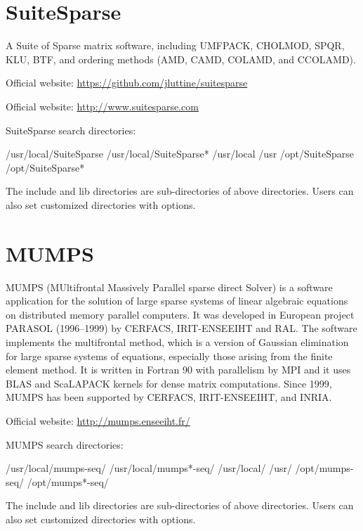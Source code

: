 \documentclass[12pt]{book}
\begin{document}
\section{SuiteSparse}
A Suite of Sparse matrix software, including UMFPACK, CHOLMOD, SPQR, KLU, BTF, and ordering methods (AMD, CAMD, COLAMD, and CCOLAMD). 

Official website: \url{https://github.com/jluttine/suitesparse} 

Official website: \url{http://www.suitesparse.com}

SuiteSparse search directories:
\begin{evb}
/usr/local/SuiteSparse
/usr/local/SuiteSparse*
/usr/local
/usr
/opt/SuiteSparse 
/opt/SuiteSparse*
\end{evb}

The include and lib directories are sub-directories of above directories. Users can also set customized directories with options.

\section{MUMPS}
MUMPS (MUltifrontal Massively Parallel sparse direct Solver) is a software application for the solution of large sparse systems of linear algebraic equations on distributed memory parallel computers. It was developed in European project PARASOL (1996–1999) by CERFACS, IRIT-ENSEEIHT and RAL. The software implements the multifrontal method, which is a version of Gaussian elimination for large sparse systems of equations, especially those arising from the finite element method. It is written in Fortran 90 with parallelism by MPI and it uses BLAS and ScaLAPACK kernels for dense matrix computations. Since 1999, MUMPS has been supported by CERFACS, IRIT-ENSEEIHT, and INRIA. 

Official website: \url{http://mumps.enseeiht.fr/}

MUMPS search directories:
\begin{evb}
/usr/local/mumps-seq/
/usr/local/mumps*-seq/
/usr/local/
/usr/
/opt/mumps-seq/
/opt/mumps*-seq/
\end{evb}

The include and lib directories are sub-directories of above directories. Users can also set customized directories with options.
\end{document}
